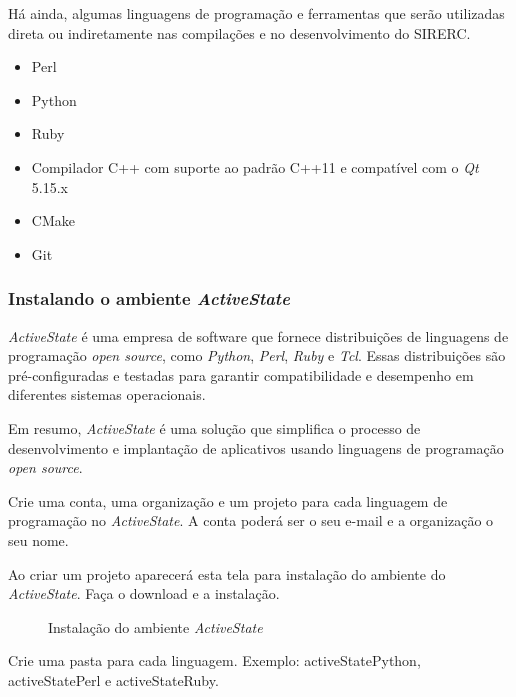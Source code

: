 \documentclass[a4paper,11pt]{article}
\newcommand{\sistema}{\textsf{SIRERC}}
\newcommand{\qt}{\textit{Qt}}
\begin{document}
Há ainda, algumas linguagens de programação e ferramentas que serão utilizadas direta ou indiretamente nas compilações e no desenvolvimento do \sistema{}.

\begin{itemize}
	\item Perl
	\item Python
	\item Ruby
	\item Compilador C++ com suporte ao padrão C++11 e compatível com o \qt{} 5.15.x
	\item CMake
	\item Git
\end{itemize}

\subsubsection{Instalando o ambiente \textit{ActiveState}}

\textit{ActiveState} é uma empresa de software que fornece distribuições de linguagens de programação \textit{open source}, como \textit{Python}, \textit{Perl}, \textit{Ruby} e \textit{Tcl}. Essas distribuições são pré-configuradas e testadas para garantir compatibilidade e desempenho em diferentes sistemas operacionais.

Em resumo, \textit{ActiveState} é uma solução que simplifica o processo de desenvolvimento e implantação de aplicativos usando linguagens de programação \textit{open source}.

Crie uma conta, uma organização e um projeto para cada linguagem de programação no \textit{ActiveState}. A conta poderá ser o seu e-mail e a organização o seu nome.

Ao criar um projeto aparecerá esta tela para instalação do ambiente do \textit{ActiveState}. Faça o download e a instalação.
\begin{figure}[H]
	\centering
	\caption{Instalação do ambiente \textit{ActiveState}}
	\label{fig:activeState_install}
\end{figure}

Crie uma pasta para cada linguagem. Exemplo: activeStatePython, activeStatePerl e activeStateRuby.
\end{document}
